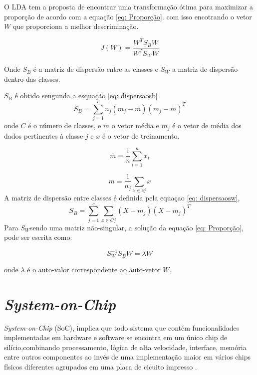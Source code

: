 O LDA tem a proposta de encontrar uma transformação ótima para maximizar a proporção de acordo com a equação \ref{eq: Proporção}.
com isso encotrando o vetor $W$ que proporciona a melhor descriminação. 

\begin{equation}
	\label{eq: Proporção}
	J(W) = \frac { W^T S_B W}{W^T S_W W}
\end{equation}

Onde $S_B$ é a matriz de dispersão entre as classes e $ S_W$ a matriz de dispersão dentro das classes. 

$S_B$ é obtido sengunda a esquação \ref{eq: dispersaosb} 
\begin{equation}
	\label{eq: dispersaosb}
	 S_B = \sum_{j=1}^{c} n_j(m_j - \bar m)(m_j -\bar m)^T 
\end{equation}
onde $C$ é o número de classes, e $\bar m$ o vetor média e  $m_j$ é o vetor de média dos dados 
pertinentes à classe $j$ e $x$ é o vetor de treinamento.

\begin{equation}
	\label{eq: media}
	\bar m = \frac{1}{n}\sum_{i=1}^{n} {x_i}
\end{equation}

\begin{equation}
	\label{eq: media2}
	m = \frac{1}{n_j}\sum_{x \in c j}^{} x
\end{equation}
A matriz de dispersão entre classes é definida pela equaçao \ref{eq: dispersaosw},
\begin{equation}
	\label{eq: dispersaosw}
	 S_B = \sum_{j=1}^{c} \sum_{x \in C j}{} (X - m_j)(X - m_j)^T 
\end{equation}
Para $S_W$sendo uma matriz não-singular, a solução da equação 
\ref{eq: Proporção}, pode ser escrita como: 

 \begin{equation}
	\label{eq: final}
	S_W^{-1} S_B W = \lambda W
\end{equation}
 
onde $\lambda$ é o auto-valor correspondente ao auto-vetor $W$.
\section{\textit{System-on-Chip}}

\textit{System-on-Chip} (SoC), implica que todo sistema que contém funcionalidades implementadas em hardware e software se encontra em um único chip de silício,combinando processamento, lógica de alta velocidade, interface, memória entre outros componentes ao invés de uma implementação maior em vários chips físicos diferentes agrupados em uma placa 
de cicuito impresso \cite{zynqBook}.

